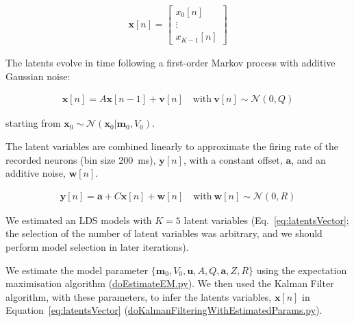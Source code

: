 \documentclass[12pt]{article}
\begin{document}
\begin{align}
    \mathbf{x}[n]=\left[\begin{array}{c}
        x_0[n]\\
                            \vdots\\
                            x_{K-1}[n]
                        \end{array}\right]
    \label{eq:latentsVector}
\end{align}

The latents evolve in time following a first-order Markov process with additive
Gaussian noise:

\begin{align*}
    \mathbf{x}[n]=A\mathbf{x}[n-1]+\mathbf{v}[n]\quad\text{with}\ \mathbf{v}[n]\sim\mathcal{N}(0, Q)
\end{align*}

\noindent starting from
$\mathbf{x}_0\sim\mathcal{N}(\mathbf{x}_0|\mathbf{m}_0,V_0)$.

The latent variables are combined linearly to approximate the firing rate of
the recorded neurons (bin size 200~ms), $\mathbf{y}[n]$, with a constant offset,
$\mathbf{a}$, and an additive noise, $\mathbf{w}[n]$.

\begin{align*}
    \mathbf{y}[n]=\mathbf{a}+C\mathbf{x}[n]+\mathbf{w}[n]\quad\text{with}\ \mathbf{w}[n]\sim\mathcal{N}(0, R)
\end{align*}

We estimated an LDS models with $K=5$ latent variables
(Eq.~\ref{eq:latentsVector}; the selection of the number of latent variables
was arbitrary, and we should perform model selection in later iterations).

We estimate  the model parameter $\{\mathbf{m}_0, V_0, \mathbf{u}, A, Q,
\mathbf{a}, Z, R\}$ using the expectation maximisation algorithm
(\href{https://github.com/joacorapela/lds_neuralLatents_striatum/blob/master/code/scripts/doEstimateEM.py}{doEstimateEM.py}).
%
We then used the Kalman Filter algorithm, with these parameters, to infer the
latents variables, $\mathbf{x}[n]$ in Equation~\ref{eq:latentsVector}
(\href{https://github.com/joacorapela/lds_neuralLatents_striatum/blob/master/code/scripts/doKalmanFilteringWithEstimatedParams.py}{doKalmanFilteringWithEstimatedParams.py}).
%
\end{document}
